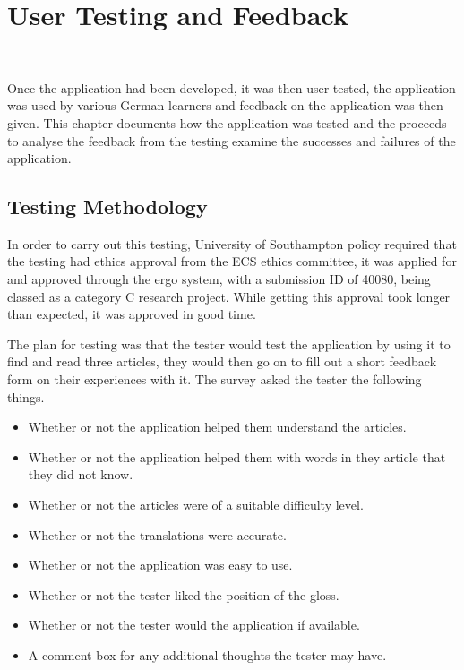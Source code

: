\chapter{User Testing and Feedback}
\

Once the application had been developed, it was then user tested, the application was used by various German learners and feedback on the application was then given. This chapter documents how the application was tested and the proceeds to analyse the feedback from the testing examine the successes and failures of the application.

\section{Testing Methodology}

In order to carry out this testing, University of Southampton policy required that the testing had ethics approval from the ECS ethics committee, it was applied for and approved through the ergo system, with a submission ID of 40080, being classed as a category C research project. While getting this approval took longer than expected, it was approved in good time.

The plan for testing was that the tester would test the application by using it to find and read three articles, they would then go on to fill out a short feedback form on their experiences with it. The survey asked the tester the following things. 
\begin{itemize}
	\item Whether or not the application helped them understand the articles.
	
	\item Whether or not the application helped them with words in they article that they did not know.
	
	\item Whether or not the articles were of a suitable difficulty level.
	
	\item Whether or not the translations were accurate.
	
	\item Whether or not the application was easy to use.
	
	\item Whether or not the tester liked the position of the gloss.
	
	\item Whether or not the tester would the application if available. 
	
	\item A comment box for any additional thoughts the tester may have. 
\end{itemize}


